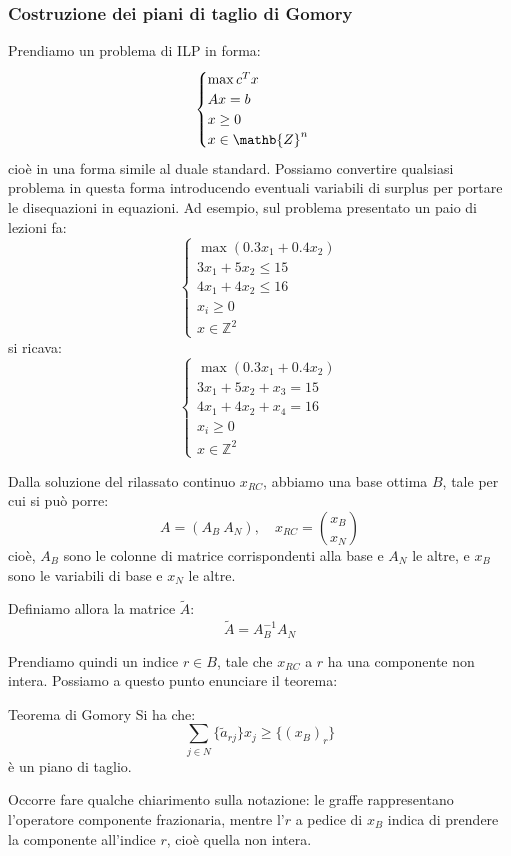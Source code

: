 \documentclass[a4paper,11pt]{article}
\begin{document}
\subsubsection{Costruzione dei piani di taglio di Gomory}
Prendiamo un problema di ILP in forma:
\[
	\begin{cases}
		\max c^T x \\ 
		Ax = b \\ 
		x \geq 0 \\ 
		x \in \mathb{Z}^n
	\end{cases}
\]
cioè in una forma simile al duale standard.
Possiamo convertire qualsiasi problema in questa forma introducendo eventuali variabili di surplus per portare le disequazioni in equazioni.
Ad esempio, sul problema presentato un paio di lezioni fa:
\[
	\begin{cases}
		\max (0.3x_1 + 0.4x_2) \\ 
		3 x_1 + 5 x_2 \leq 15 \\ 
		4 x_1 + 4 x_2 \leq 16 \\ 
		x_i \geq 0 \\ 
		x \in \mathbb{Z}^2
	\end{cases}
\]
si ricava:
\[
	\begin{cases}
		\max (0.3x_1 + 0.4x_2) \\ 
		3 x_1 + 5 x_2 + x_3 = 15 \\ 
		4 x_1 + 4 x_2 + x_4 = 16 \\ 
		x_i \geq 0 \\ 
		x \in \mathbb{Z}^2
	\end{cases}
\]

Dalla soluzione del rilassato continuo $x_{RC}$, abbiamo una base ottima $B$, tale per cui si può porre:
$$
A = (A_B \  A_N), \quad x_{RC} = \binom{x_B}{x_N}
$$
cioè, $A_B$ sono le colonne di matrice corrispondenti alla base e $A_N$ le altre, e $x_B$ sono le variabili di base e $x_N$ le altre. 

Definiamo allora la matrice $\tilde{A}$:
$$ \tilde{A} = A_B^{-1} A_N $$

Prendiamo quindi un indice $r \in B$, tale che $x_{RC}$ a $r$ ha una componente non intera.
Possiamo a questo punto enunciare il teorema:

\begin{theorem}{Teorema di Gomory}
	Si ha che:
	$$
		\sum_{j \in N} \{ \tilde{a}_{rj} \} x_j \geq \{ ( x_{B} )_r \}
	$$
	è un piano di taglio.
\end{theorem}

Occorre fare qualche chiarimento sulla notazione: le graffe rappresentano l'operatore componente frazionaria, mentre l'$r$ a pedice di $x_{B}$ indica di prendere la componente all'indice $r$, cioè quella non intera.
\end{document}

